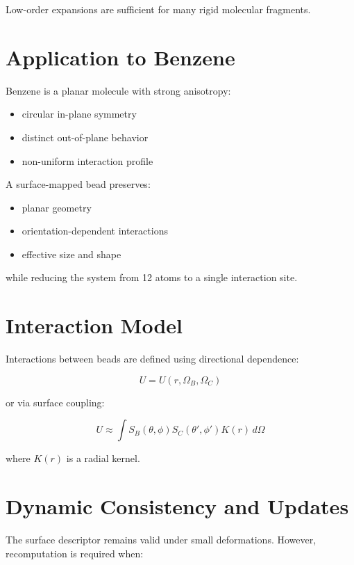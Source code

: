 \documentclass[11pt]{article}
\begin{document}
Low-order expansions are sufficient for many rigid molecular fragments.

\section{Application to Benzene}

Benzene is a planar molecule with strong anisotropy:

\begin{itemize}
    \item circular in-plane symmetry
    \item distinct out-of-plane behavior
    \item non-uniform interaction profile
\end{itemize}

A surface-mapped bead preserves:
\begin{itemize}
    \item planar geometry
    \item orientation-dependent interactions
    \item effective size and shape
\end{itemize}

while reducing the system from 12 atoms to a single interaction site.

\section{Interaction Model}

Interactions between beads are defined using directional dependence:

\begin{equation}
U = U(r, \Omega_B, \Omega_C)
\end{equation}

or via surface coupling:

\begin{equation}
U \approx \int S_B(\theta, \phi) S_C(\theta', \phi') K(r) \, d\Omega
\end{equation}

where $K(r)$ is a radial kernel.

\section{Dynamic Consistency and Updates}

The surface descriptor remains valid under small deformations. However, recomputation is required when:
\end{document}
